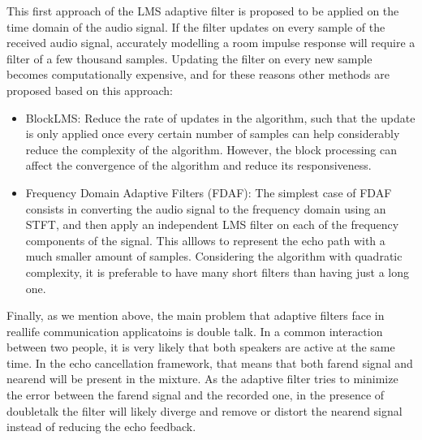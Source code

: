 \documentclass[letterpaper,10pt,english]{jupyterBook}
\begin{document}
\sphinxAtStartPar
This first approach of the LMS adaptive filter is proposed to be applied
on the time domain of the audio signal. If the filter updates on every
sample of the received audio signal, accurately modelling a room impulse
response will require a filter of a few thousand samples. Updating the
filter on every new sample becomes computationally expensive, and for
these reasons other methods are proposed based on this approach:
\begin{itemize}
\item {} 
\sphinxAtStartPar
BlockLMS: Reduce the rate of updates in the algorithm, such that the
update is only applied once every certain number of samples can help
considerably reduce the complexity of the algorithm. However, the
block processing can affect the convergence of the algorithm and
reduce its responsiveness.

\item {} 
\sphinxAtStartPar
Frequency Domain Adaptive Filters (FDAF): The simplest case of FDAF
consists in converting the audio signal to the frequency domain
using an STFT, and then apply an independent LMS filter on each of
the frequency components of the signal. This alllows to represent
the echo path with a much smaller amount of samples. Considering the
algorithm with quadratic complexity, it is preferable to have many
short filters than having just a long one.

\end{itemize}

\sphinxAtStartPar
Finally, as we mention above, the main problem that adaptive filters
face in real\sphinxhyphen{}life communication applicatoins is double talk. In a common
interaction between two people, it is very likely that both speakers are
active at the same time. In the echo cancellation framework, that means
that both far\sphinxhyphen{}end signal  and near\sphinxhyphen{}end  will be present in
the mixture. As the adaptive filter tries to minimize the error between
the far\sphinxhyphen{}end signal and the recorded one, in the presence of double\sphinxhyphen{}talk
the filter will likely diverge and remove or distort the near\sphinxhyphen{}end signal
instead of reducing the echo feedback.
\end{document}
